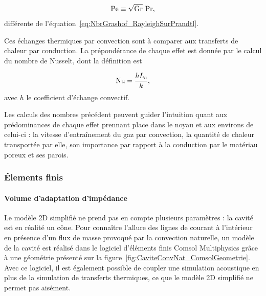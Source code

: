 \begin{equation}
	\mathrm{Pe} \equiv \sqrt{\mathrm{Gr}}~\mathrm{Pr},
	\label{eq:NbrPeclet_GrashofFoisPrandtl}
\end{equation}
différente de l'équation~\eqref{eq:NbrGrashof_RayleighSurPrandtl}.

Ces échanges thermiques par convection sont à comparer aux transferts de chaleur par conduction. La prépondérance de chaque effet est donnée par le calcul du nombre de Nusselt, dont la définition est

\begin{equation}
	\mathrm{Nu} = \frac{h L_c}{k},
\end{equation}
avec $h$ le coefficient d'échange convectif.\bigskip

Les calculs des nombres précédent peuvent guider l'intuition quant aux prédominances de chaque effet prennant place dans le noyau et aux environs de celui-ci : la vitesse d'entraînement du gaz par convection, la quantité de chaleur transportée par elle, son importance par rapport à la conduction par le matériau poreux et ses parois.

\subsubsection{\'Elements finis}
\paragraph{Volume d'adaptation d'impédance}
Le modèle 2D simplifié ne prend pas en compte plusieurs paramètres : la cavité est en réalité un cône. Pour connaître l'allure des lignes de courant à l'intérieur en présence d'un flux de masse provoqué par la convection naturelle, un modèle de la cavité est réalisé dans le logiciel d'éléments finis Comsol Multiphysics grâce à une géométrie présenté sur la figure~\ref{fig:CaviteConvNat_ComsolGeometrie}. Avec ce logiciel, il est également possible de coupler une simulation acoustique en plus de la simulation de transferts thermiques, ce que le modèle 2D simplifié ne permet pas aisément.

